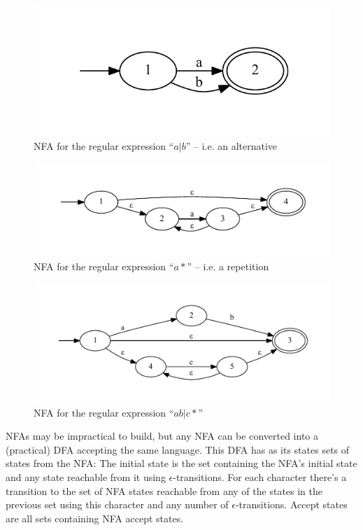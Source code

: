 			\begin{figure}
			\centering
			\includegraphics{figures/re_alternative}
			\caption{NFA for the regular expression ``$a|b$'' -- i.e. an alternative}
			\label{fig:re_nfa_alternative}
			\end{figure}
			
			\begin{figure}
			\centering
			\includegraphics[width=\textwidth]{figures/re_kleene}
			\caption{NFA for the regular expression ``$a*$'' -- i.e. a repetition}
			\label{fig:re_nfa_kleene}
			\end{figure}
			
			\begin{figure}
			\centering
			\includegraphics[width=\textwidth]{figures/re_example}
			\caption{NFA for the regular expression ``$ab|c*$''}
			\label{fig:re_nfa_example}
			\end{figure}
			
			NFAs may be impractical to build, but any NFA can be converted into a (practical) DFA accepting the same language. This DFA has as its states sets of states from the NFA: The initial state is the set containing the NFA's initial state and any state reachable from it using $\epsilon$-transitions. For each character there's a transition to the set of NFA states reachable from any of the states in the previous set using this character and any number of $\epsilon$-transitions. Accept states are all sets containing NFA accept states.
			
